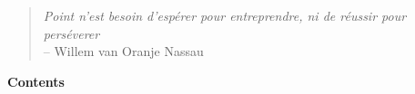     \begin{quotation}
        \footnotesize\emph{Point n'est besoin d'espérer pour entreprendre, ni de réussir pour perséverer}\\
        \raggedleft -- Willem van Oranje Nassau
    \end{quotation}




    \clearpage



    \begin{center}
        \textbf{Contents}
    \end{center}

    \tableofcontents




    \reversemarginpar





    \clearpage
    
    \clearpage
    
    \clearpage
    
    \clearpage
    



    \clearpage


    



    \clearpage

    
    \printbibliography


